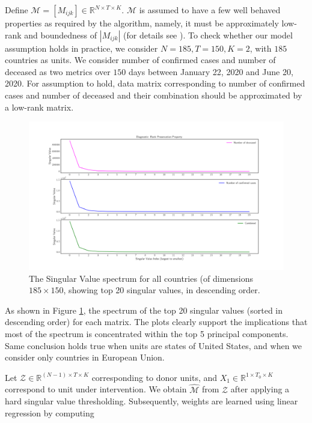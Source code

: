 \documentclass[preprint,authoryear,12pt]{elsarticle}
\begin{document}
	Define $\mathcal{M} = [M_{ijk}] \in \mathbb{R}^{N \times T \times K}$. $\mathcal{M}$ is assumed to have a few well behaved properties as required by the algorithm, namely, it must be approximately low-rank and boundedness of $\left|M_{ijk}\right|$ (for details see \cite{AMSS19}). To check whether our model assumption holds in practice, we consider $N=185, T=150, K=2$, with $185$ countries as units. We consider number of confirmed cases and number of deceased as two metrics over $150$ days between January 22, 2020 and June 20, 2020. For assumption to hold, data matrix corresponding to number of confirmed cases and number of deceased and their combination should be approximated by a low-rank matrix. 
	
	\begin{figure}
		\includegraphics[width=\textwidth]{rd}
		\caption{The Singular Value spectrum for all countries (of dimensions $185 \times 150$, showing top 20 singular values, in descending order.} 
		\label{fig1} 
	\end{figure}
	
	As shown in Figure \ref{fig1}, the spectrum of the top 20 singular values (sorted in descending order) for each matrix. The plots clearly support the implications that most of the spectrum is concentrated within the top 5 principal components. Same conclusion holds true when units are states of United States, and when we consider only countries in European Union.\par
	
	Let $\mathcal{Z} \in \mathbb{R}^{(N-1) \times T \times K}$ corresponding to donor units, and $X_1 \in \mathbb{R}^{1 \times T_0 \times K}$ correspond to unit under intervention. We obtain $\hat{\mathcal{M}}$ from $\mathcal{Z}$ after applying a hard singular value thresholding. Subsequently, weights are learned using linear regression by computing
	
\end{document}
